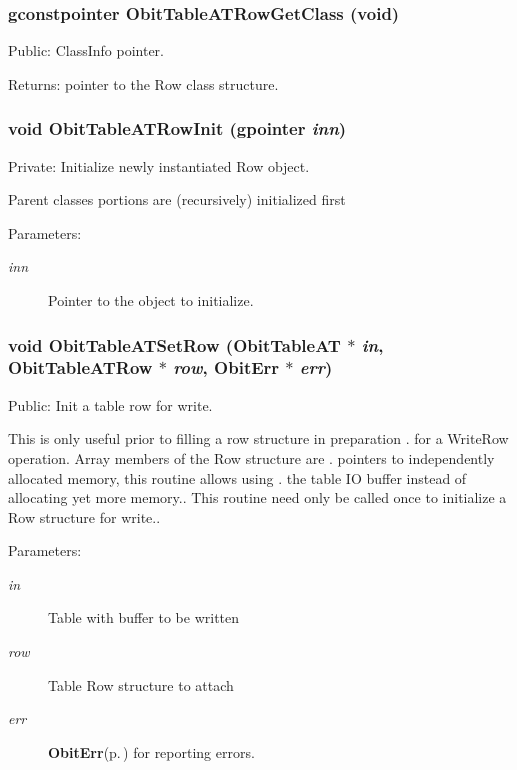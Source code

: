 \subsubsection{\setlength{\rightskip}{0pt plus 5cm}gconstpointer Obit\-Table\-ATRow\-Get\-Class (void)}\label{ObitTableAT_8c_a15}


Public: Class\-Info pointer. 

\begin{Desc}
\item[Returns:]pointer to the Row class structure. \end{Desc}
\subsubsection{\setlength{\rightskip}{0pt plus 5cm}void Obit\-Table\-ATRow\-Init (gpointer {\em inn})}\label{ObitTableAT_8c_a6}


Private: Initialize newly instantiated Row object. 

Parent classes portions are (recursively) initialized first \begin{Desc}
\item[Parameters:]
\begin{description}
\item[{\em inn}]Pointer to the object to initialize. \end{description}
\end{Desc}
\subsubsection{\setlength{\rightskip}{0pt plus 5cm}void Obit\-Table\-ATSet\-Row ({\bf Obit\-Table\-AT} $\ast$ {\em in}, {\bf Obit\-Table\-ATRow} $\ast$ {\em row}, {\bf Obit\-Err} $\ast$ {\em err})}\label{ObitTableAT_8c_a23}


Public: Init a table row for write. 

This is only useful prior to filling a row structure in preparation . for a Write\-Row operation. Array members of the Row structure are . pointers to independently allocated memory, this routine allows using . the table IO buffer instead of allocating yet more memory.. This routine need only be called once to initialize a Row structure for write.. \begin{Desc}
\item[Parameters:]
\begin{description}
\item[{\em in}]Table with buffer to be written \item[{\em row}]Table Row structure to attach \item[{\em err}]{\bf Obit\-Err}{\rm (p.\,\pageref{structObitErr})} for reporting errors. \end{description}
\end{Desc}
